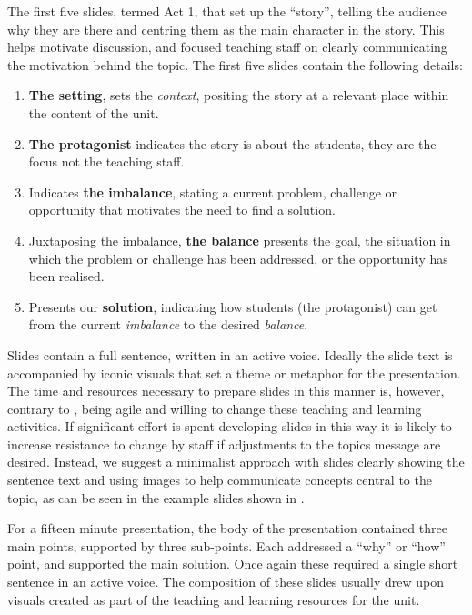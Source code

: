 The first five slides, termed Act 1, that set up the ``story'', telling the audience why they are there and centring them as the main character in the story. This helps motivate discussion, and focused teaching staff on clearly communicating the motivation behind the topic. The first five slides contain the following details:
\begin{enumerate}[label=Slide \arabic*:,labelwidth=*,align=left,noitemsep,nolistsep]
	\item \textbf{The setting}, sets the \emph{context}, positing the story at a relevant place within the content of the unit.
	\item \textbf{The protagonist} indicates the story is about the students, they are the focus not the teaching staff.
	\item Indicates \textbf{the imbalance}, stating a current problem, challenge or opportunity that motivates the need to find a solution.
	\item Juxtaposing the imbalance, \textbf{the balance} presents the goal, the situation in which the problem or challenge has been addressed, or the opportunity has been realised.
	\item Presents our \textbf{solution}, indicating how students (the protagonist) can get from the current \emph{imbalance} to the desired \emph{balance}.
\end{enumerate}

Slides contain a full sentence, written in an active voice. Ideally the slide text is accompanied by iconic visuals that set a theme or metaphor for the presentation. The time and resources necessary to prepare slides in this manner is, however, contrary to , being agile and willing to change these teaching and learning activities. If significant effort is spent developing slides in this way it is likely to increase resistance to change by staff if adjustments to the topics message are desired. Instead, we suggest a minimalist approach with slides clearly showing the sentence text and using images to help communicate concepts central to the topic, as can be seen in the example slides shown in .

For a fifteen minute presentation, the body of the presentation contained three main points, supported by three sub-points. Each addressed a ``why'' or ``how'' point, and supported the main solution. Once again these required a single short sentence in an active voice. The composition of these slides usually drew upon visuals created as part of the teaching and learning resources for the unit.

